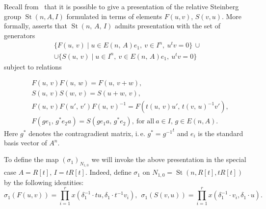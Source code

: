 \documentclass[oneside, 10pt]{amsart}
\DeclareMathOperator{\St}{St}
\numberwithin{equation}{section}
\numberwithin{lemma}{section}
\theoremstyle{definition}
\theoremstyle{remark}
\begin{document}
Recall from~\cite{LS17} that it is possible to give a presentation of the relative Steinberg group $\St(n, A, I)$ formulated in terms of elements $F(u, v)$, $S(v, u)$.
More formally, \cite[Proposition 3.10]{LS17} asserts that $\St(n,\,A,\,I)$ admits presentation with the set of generators
\begin{multline*} \{F(u,\,v)\mid u\in E(n,\,A)e_1,\ v\in I^n,\ u^tv=0\}\, \cup \\ \cup \{S(u,\,v)\mid u\in I^n,\ v\in E(n,\,A)e_1,\ u^tv=0\}\end{multline*}
subject to relations
\setcounter{equation}{0}
\renewcommand{\theequation}{R\arabic{equation}}

\begin{align}
&F(u,\,v)F(u,\,w)=F(u,\,v+w), \label{add4}\\
&S(u,\,v)S(w,\,v)=S(u+w,\,v), \label{add5}\\
&F(u,\,v)F(u',\,v')F(u,\,v)^{-1}=F(t(u,\,v)u',\,t(v,\,u)^{-1} v'), \label{conj3} \\
&F(ge_1,\,g^*e_2a)=S(ge_1a,\,g^*e_2),\ \text{for all}\ a\in I,\, g \in E(n, A).
\end{align}
Here $g^*$ denotes the contragradient matrix, i.\,e. $g^* = {g^{-1}}^t$ and $e_i$ is the standard basis vector of $A^n$.

\setcounter{equation}{3}
\renewcommand{\theequation}{\arabic{equation}}

To define the map $(\sigma_1)_{N_{1,0}}$ we will invoke the above presentation in the special case $A=R[t]$, $I=tR[t]$.
Indeed, define $\sigma_1$ on $N_{1,0}=\St(n, R[t], tR[t])$ by the following identities: 
\begin{equation}
 \sigma_1(F(u, v)) = \prod\limits_{i=1}^r x(\delta_1^{-1} \cdot t u, \delta_1 \cdot t^{-1} v_i),\ \
 \sigma_1(S(v, u)) = \prod\limits_{i=1}^r x(\delta_1^{-1} \cdot v_i, \delta_1 \cdot u).
\end{equation}
\end{document}
